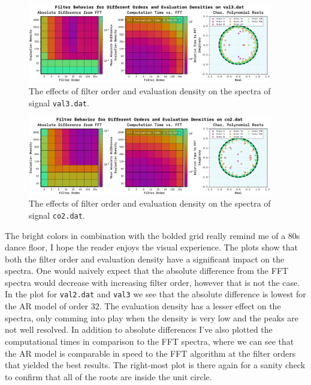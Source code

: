 \documentclass[10pt, titlepage, a4paper]{article}
\begin{document}
\begin{figure}[H]
    \centering
    \includegraphics[width=0.95\textwidth]{../MaxEntropy/Images/order-density-val3.dat.pdf}
    \caption{The effects of filter order and evaluation density on the spectra of signal \texttt{val3.dat}.}
    \label{fig:order-2}
\end{figure}

\begin{figure}[H]
    \centering
    \includegraphics[width=0.95\textwidth]{../MaxEntropy/Images/order-density-co2.dat.pdf}
    \caption{The effects of filter order and evaluation density on the spectra of signal \texttt{co2.dat}.}
    \label{fig:order-3}
\end{figure}

The bright colors in combination with the bolded grid really remind me of a 80s dance floor, I hope the reader enjoys
the visual experience. The plots show that both the filter order and evaluation density have a significant impact 
on the spectra. One would naively expect that the absolute difference from the FFT spectra would decrease with 
increasing filter order, however that is not the case. In the plot for \texttt{val2.dat} and \texttt{val3} we see that the absolute
difference is lowest for the AR model of order $32$. The evaluation density has a lesser effect on the spectra, only comming 
into play when the density is very low and the peaks are not well resolved. In addition to absolute differences I've also plotted 
the computational times in comparison to the FFT spectra, where we can see that the AR model is comparable in speed 
to the FFT algorithm at the filter orders that yielded the best results. The right-most plot is there again for a 
sanity check to confirm that all of the roots are inside the unit circle. \\
\end{document}
